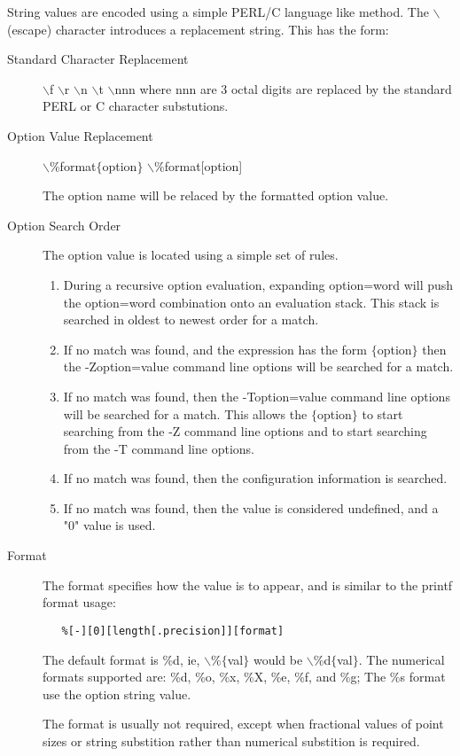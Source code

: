 \documentclass[a4paper]{article}
\begin{document}
String values are encoded using a
simple PERL/C language like method.  The $\backslash$ (escape) character
introduces a replacement string.  This has the form:
\begin{description}
\item[Standard Character Replacement] \mbox{}

{\ttfamily  $\backslash$f $\backslash$r $\backslash$n $\backslash$t $\backslash$nnn}
where nnn are 3 octal digits are replaced
by the standard PERL or C character substutions.

\item[Option Value Replacement] \mbox{}

{\ttfamily $\backslash$\%format$\{$option$\}$    $\backslash$\%format[option]}

The option name will be relaced by the formatted option value.

\item[Option Search Order] \mbox{}

The option value is located using a simple set of rules.
\begin{enumerate}
\item During a recursive option evaluation,
expanding
{\ttfamily option=word}
will push the
{\ttfamily option=word}
combination onto an evaluation stack.
This stack is searched in oldest to newest order for a match.
\item If no match was found,
and the expression has the form
{\ttfamily $\{$option$\}$}
then the
{\ttfamily -Zoption=value}
command line options will be searched for a match.
\item If no match was found,
then the
{\ttfamily -Toption=value}
command line options will be searched for a match.
This allows the 
{\ttfamily $\{$option$\}$}
to start searching from the -Z command line options and
{\ttfamily [option]}
to start searching from the -T command line options.
\item If no match was found,
then the configuration information is searched.
\item If no match was found,
then the value is considered undefined,
and a 
{\ttfamily "0"}
value is used.
\end{enumerate}


\item[Format] \mbox{}

The format specifies how the value is to appear,
and is similar to the printf format usage:
\begin{tscreen}
\begin{verbatim}
   %[-][0][length[.precision]][format]
\end{verbatim}
\end{tscreen}


The default format is \%d, ie, $\backslash$\%$\{$val$\}$ would be $\backslash$\%d$\{$val$\}$.
The numerical formats supported are: \%d, \%o, \%x, \%X, \%e, \%f, and \%g;
The \%s format use the option string value.

The format is usually not required, except when fractional values of point sizes
or string substition rather than numerical substition is required.

\end{description}
\end{document}
